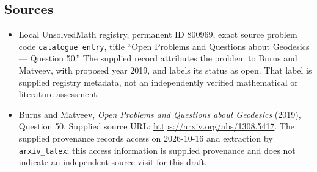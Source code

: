 \documentclass[11pt]{article}
\begin{document}
\subsection{Sources}
\begin{itemize}
\item Local UnsolvedMath registry, permanent ID \(800969\), exact source problem code \texttt{catalogue entry}, title ``Open Problems and Questions about Geodesics --- Question 50.'' The supplied record attributes the problem to Burns and Matveev, with proposed year 2019, and labels its status as open. That label is supplied registry metadata, not an independently verified mathematical or literature assessment.
\item Burns and Matveev, \emph{Open Problems and Questions about Geodesics} (2019), Question 50. Supplied source URL: \url{https://arxiv.org/abs/1308.5417}. The supplied provenance records access on 2026-10-16 and extraction by \texttt{arxiv\_latex}; this access information is supplied provenance and does not indicate an independent source visit for this draft.
\end{itemize}
\end{document}

